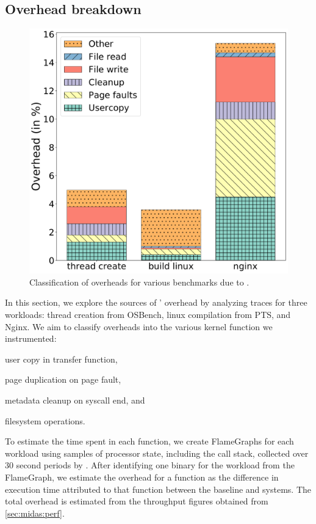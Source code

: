 \subsection{Overhead breakdown}

\begin{figure}
  \centering
  \includegraphics[width=0.7\linewidth]{media/midas/overhead.pdf}
  \caption{Classification of overheads for various benchmarks due to \midas.}
  \label{fig:midas:overhead_class}
\end{figure}

In this section, we explore the sources of \midas' overhead by analyzing
 traces for three workloads: thread creation from OSBench, linux
compilation from PTS, and Nginx.
We aim to classify overheads into the various kernel function we instrumented:
\begin{inparaenum}
\item user copy in transfer function,
\item page duplication on page fault,
\item metadata cleanup on syscall end, and
\item filesystem operations.
\end{inparaenum}

To estimate the time spent in each function, we create FlameGraphs for
each workload\cite{GreggFlameGraph} using samples of processor state, including
the call stack, collected over 30 second periods by .
After identifying one binary for the workload from the FlameGraph, we estimate
the overhead for a function as the difference in execution time attributed to
that function between the baseline and \midas systems.
The total overhead is estimated from the throughput figures obtained from
\autoref{sec:midas:perf}.

